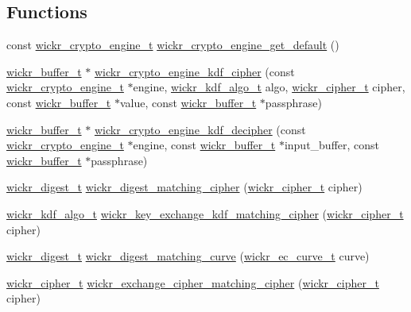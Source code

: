 \subsection*{Functions}
\begin{DoxyCompactItemize}
\item 
const \hyperlink{structwickr__crypto__engine}{wickr\+\_\+crypto\+\_\+engine\+\_\+t} \hyperlink{group__wickr__crypto__engine_ga74d5cea6c7d1d6e67b1be476fbaf6235}{wickr\+\_\+crypto\+\_\+engine\+\_\+get\+\_\+default} ()
\item 
\hyperlink{structwickr__buffer}{wickr\+\_\+buffer\+\_\+t} $\ast$ \hyperlink{group__wickr__crypto__engine_ga5709d94cd09ef0fb47d1a5f59232f115}{wickr\+\_\+crypto\+\_\+engine\+\_\+kdf\+\_\+cipher} (const \hyperlink{structwickr__crypto__engine}{wickr\+\_\+crypto\+\_\+engine\+\_\+t} $\ast$engine, \hyperlink{structwickr__kdf__algo}{wickr\+\_\+kdf\+\_\+algo\+\_\+t} algo, \hyperlink{structwickr__cipher}{wickr\+\_\+cipher\+\_\+t} cipher, const \hyperlink{structwickr__buffer}{wickr\+\_\+buffer\+\_\+t} $\ast$value, const \hyperlink{structwickr__buffer}{wickr\+\_\+buffer\+\_\+t} $\ast$passphrase)
\item 
\hyperlink{structwickr__buffer}{wickr\+\_\+buffer\+\_\+t} $\ast$ \hyperlink{group__wickr__crypto__engine_gab60480270e80ba34aa44385633037983}{wickr\+\_\+crypto\+\_\+engine\+\_\+kdf\+\_\+decipher} (const \hyperlink{structwickr__crypto__engine}{wickr\+\_\+crypto\+\_\+engine\+\_\+t} $\ast$engine, const \hyperlink{structwickr__buffer}{wickr\+\_\+buffer\+\_\+t} $\ast$input\+\_\+buffer, const \hyperlink{structwickr__buffer}{wickr\+\_\+buffer\+\_\+t} $\ast$passphrase)
\item 
\hyperlink{structwickr__digest}{wickr\+\_\+digest\+\_\+t} \hyperlink{group__wickr__crypto__engine_ga18c21501a41c97f2ba79a9366343cdcf}{wickr\+\_\+digest\+\_\+matching\+\_\+cipher} (\hyperlink{structwickr__cipher}{wickr\+\_\+cipher\+\_\+t} cipher)
\item 
\hyperlink{structwickr__kdf__algo}{wickr\+\_\+kdf\+\_\+algo\+\_\+t} \hyperlink{group__wickr__crypto__engine_ga6cdd263ddccd0b28a85ed61889805e60}{wickr\+\_\+key\+\_\+exchange\+\_\+kdf\+\_\+matching\+\_\+cipher} (\hyperlink{structwickr__cipher}{wickr\+\_\+cipher\+\_\+t} cipher)
\item 
\hyperlink{structwickr__digest}{wickr\+\_\+digest\+\_\+t} \hyperlink{group__wickr__crypto__engine_ga0a708e5e46c40eae5eaeb581f6a1aed2}{wickr\+\_\+digest\+\_\+matching\+\_\+curve} (\hyperlink{structwickr__ec__curve}{wickr\+\_\+ec\+\_\+curve\+\_\+t} curve)
\item 
\hyperlink{structwickr__cipher}{wickr\+\_\+cipher\+\_\+t} \hyperlink{group__wickr__crypto__engine_gaf44e3be9066727bf83034d3593dc74e2}{wickr\+\_\+exchange\+\_\+cipher\+\_\+matching\+\_\+cipher} (\hyperlink{structwickr__cipher}{wickr\+\_\+cipher\+\_\+t} cipher)
\end{DoxyCompactItemize}
